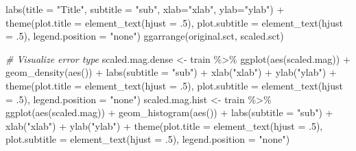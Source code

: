 \documentclass[
]{article}
\newenvironment{Shaded}{\begin{snugshade}}{\end{snugshade}}
\newcommand{\AttributeTok}[1]{\textcolor[rgb]{0.77,0.63,0.00}{#1}}
\newcommand{\CommentTok}[1]{\textcolor[rgb]{0.56,0.35,0.01}{\textit{#1}}}
\newcommand{\DecValTok}[1]{\textcolor[rgb]{0.00,0.00,0.81}{#1}}
\newcommand{\FunctionTok}[1]{\textcolor[rgb]{0.00,0.00,0.00}{#1}}
\newcommand{\NormalTok}[1]{#1}
\newcommand{\OtherTok}[1]{\textcolor[rgb]{0.56,0.35,0.01}{#1}}
\newcommand{\SpecialCharTok}[1]{\textcolor[rgb]{0.00,0.00,0.00}{#1}}
\newcommand{\StringTok}[1]{\textcolor[rgb]{0.31,0.60,0.02}{#1}}
\begin{document}
\begin{Shaded}
\begin{Highlighting}[]
  \FunctionTok{labs}\NormalTok{(}\AttributeTok{title =} \StringTok{"Title"}\NormalTok{, }\AttributeTok{subtitle =} \StringTok{"sub"}\NormalTok{, }\AttributeTok{xlab=}\StringTok{"xlab"}\NormalTok{, }\AttributeTok{ylab=}\StringTok{"ylab"}\NormalTok{) }\SpecialCharTok{+} 
  \FunctionTok{theme}\NormalTok{(}\AttributeTok{plot.title =} \FunctionTok{element\_text}\NormalTok{(}\AttributeTok{hjust =}\NormalTok{ .}\DecValTok{5}\NormalTok{), }\AttributeTok{plot.subtitle =} \FunctionTok{element\_text}\NormalTok{(}\AttributeTok{hjust =}\NormalTok{ .}\DecValTok{5}\NormalTok{), }\AttributeTok{legend.position =} \StringTok{"none"}\NormalTok{)}
\FunctionTok{ggarrange}\NormalTok{(original.sct, scaled.sct)}
\end{Highlighting}
\end{Shaded}

\begin{Shaded}
\begin{Highlighting}[]
\CommentTok{\# Visualize error type}
\NormalTok{scaled.mag.dense }\OtherTok{\textless{}{-}}\NormalTok{ train }\SpecialCharTok{\%\textgreater{}\%} 
  \FunctionTok{ggplot}\NormalTok{(}\FunctionTok{aes}\NormalTok{(scaled.mag)) }\SpecialCharTok{+} 
  \FunctionTok{geom\_density}\NormalTok{(}\FunctionTok{aes}\NormalTok{()) }\SpecialCharTok{+}
  \FunctionTok{labs}\NormalTok{(}\AttributeTok{subtitle =} \StringTok{"sub"}\NormalTok{) }\SpecialCharTok{+} 
  \FunctionTok{xlab}\NormalTok{(}\StringTok{"xlab"}\NormalTok{) }\SpecialCharTok{+}
  \FunctionTok{ylab}\NormalTok{(}\StringTok{"ylab"}\NormalTok{) }\SpecialCharTok{+}
  \FunctionTok{theme}\NormalTok{(}\AttributeTok{plot.title =} \FunctionTok{element\_text}\NormalTok{(}\AttributeTok{hjust =}\NormalTok{ .}\DecValTok{5}\NormalTok{), }\AttributeTok{plot.subtitle =} \FunctionTok{element\_text}\NormalTok{(}\AttributeTok{hjust =}\NormalTok{ .}\DecValTok{5}\NormalTok{), }\AttributeTok{legend.position =} \StringTok{"none"}\NormalTok{)}
\NormalTok{scaled.mag.hist }\OtherTok{\textless{}{-}}\NormalTok{ train }\SpecialCharTok{\%\textgreater{}\%} 
  \FunctionTok{ggplot}\NormalTok{(}\FunctionTok{aes}\NormalTok{(scaled.mag)) }\SpecialCharTok{+} 
  \FunctionTok{geom\_histogram}\NormalTok{(}\FunctionTok{aes}\NormalTok{()) }\SpecialCharTok{+}
  \FunctionTok{labs}\NormalTok{(}\AttributeTok{subtitle =} \StringTok{"sub"}\NormalTok{) }\SpecialCharTok{+} 
  \FunctionTok{xlab}\NormalTok{(}\StringTok{"xlab"}\NormalTok{) }\SpecialCharTok{+}
  \FunctionTok{ylab}\NormalTok{(}\StringTok{"ylab"}\NormalTok{) }\SpecialCharTok{+}
  \FunctionTok{theme}\NormalTok{(}\AttributeTok{plot.title =} \FunctionTok{element\_text}\NormalTok{(}\AttributeTok{hjust =}\NormalTok{ .}\DecValTok{5}\NormalTok{), }\AttributeTok{plot.subtitle =} \FunctionTok{element\_text}\NormalTok{(}\AttributeTok{hjust =}\NormalTok{ .}\DecValTok{5}\NormalTok{), }\AttributeTok{legend.position =} \StringTok{"none"}\NormalTok{)}

\end{Highlighting}
\end{Shaded}
\end{document}
